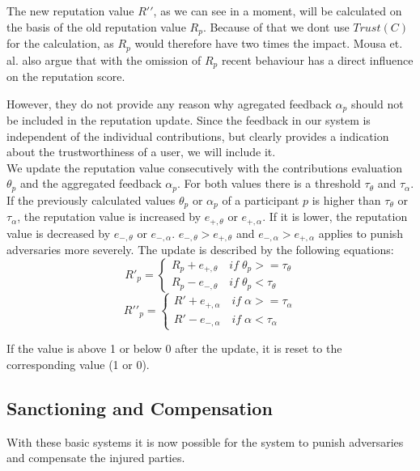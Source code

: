 The new reputation value $R\prime\prime$, as we can see in a moment, will be calculated on the basis of the old reputation value $R_p$. Because of that we dont use $Trust(C)$ for the calculation, as $R_p$ would therefore have two times the impact. Mousa et. al. also argue that with the omission of $R_p$ recent behaviour has a direct influence on the reputation score.

However, they do not provide any reason why agregated feedback $\alpha_p$ should not be included in the reputation update. Since the feedback in our system is independent of the individual contributions, but clearly provides a indication about the trustworthiness of a user, we will include it.\\

We update the reputation value consecutively with the contributions evaluation $\theta_p$  and the aggregated feedback $\alpha_p$. For both values there is a threshold $\tau_\theta$ and $\tau_\alpha$. If the previously calculated values $\theta_p$ or $\alpha_p$ of a participant $p$ is higher than $\tau_\theta$ or $\tau_\alpha$, the reputation value is increased by $e_{+,\theta}$ or $e_{+,\alpha}$. If it is lower, the reputation value is decreased by $e_{-,\theta}$ or $e_{-,\alpha}$. $e_{-,\theta}>e_{+,\theta}$ and $e_{-,\alpha}>e_{+,\alpha}$ applies to punish adversaries more severely. The update is described by the following equations: 
\begin{equation}
  R\prime_p = \begin{cases} R_p + e_{+,\theta}\quad if\; \theta_p>=\tau_\theta \\ R_p - e_{-,\theta}\quad if\; \theta_p<\tau_\theta \end{cases}
\end{equation}
\begin{equation}
  R\prime\prime_p = \begin{cases} R\prime + e_{+,\alpha}\quad if\; \alpha>=\tau_\alpha \\ R\prime - e_{-,\alpha}\quad if\; \alpha<\tau_\alpha \end{cases}
\end{equation}

If the value is above 1 or below 0 after the update, it is reset to the corresponding value (1 or 0).

\subsection{Sanctioning and Compensation}\label{section:Sanctioning and Compensation} With these basic systems it is now possible for the system to punish adversaries and compensate the injured parties. 

